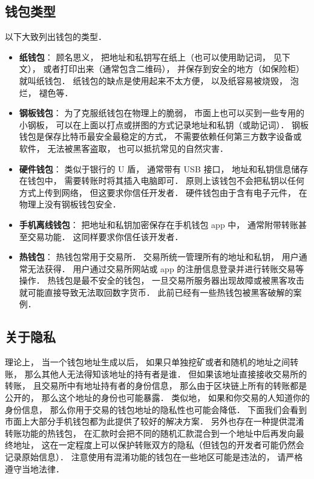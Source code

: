 \subsection{钱包类型}
以下大致列出钱包的类型．
\begin{itemize}
\item \textbf{纸钱包}： 顾名思义， 把地址和私钥写在纸上（也可以使用助记词， 见下文）， 或者打印出来（通常包含二维码）， 并保存到安全的地方（如保险柜）就叫纸钱包． 纸钱包的缺点是使用起来不太方便， 以及纸容易被烧毁， 泡烂， 褪色等．
\item \textbf{钢板钱包}： 为了克服纸钱包在物理上的脆弱， 市面上也可以买到一些专用的小钢板， 可以在上面以打点或拼图的方式记录地址和私钥（或助记词）． 钢板钱包是保存比特币最安全最稳定的方式， 不需要依赖任何第三方数字设备或软件， 无法被黑客盗取， 也可以抵抗常见的自然灾害．
\item \textbf{硬件钱包}： 类似于银行的 U 盾， 通常带有 USB 接口， 地址和私钥信息储存在钱包中， 需要转账时将其插入电脑即可． 原则上该钱包不会把私钥以任何方式上传到网络， 但这要求你信任开发者． 硬件钱包由于含有电子元件， 在物理上没有钢板钱包安全．
\item \textbf{手机离线钱包}： 把地址和私钥加密保存在手机钱包 app 中， 通常附带转账甚至交易功能． 这同样要求你信任该开发者．
\item \textbf{热钱包}： 热钱包常用于交易所． 交易所统一管理所有的地址和私钥， 用户通常无法获得． 用户通过交易所网站或 app 的注册信息登录并进行转账交易等操作． 热钱包是最不安全的钱包， 一旦交易所服务器出现故障或被黑客攻击就可能直接导致无法取回数字货币． 此前已经有一些热钱包被黑客破解的案例．
\end{itemize}

\subsection{关于隐私}
理论上， 当一个钱包地址生成以后， 如果只单独挖矿或者和随机的地址之间转账， 那么其他人无法得知该地址的持有者是谁． 但如果该地址直接接收交易所的转账， 且交易所中有地址持有者的身份信息， 那么由于区块链上所有的转账都是公开的， 那么这个地址的身份也可能暴露． 类似地， 如果和你交易的人知道你的身份信息， 那么你用于交易的钱包地址的隐私性也可能会降低． 下面我们会看到市面上大部分手机钱包都为此提供了较好的解决方案． 另外也存在一种提供混淆转账功能的热钱包， 在汇款时会把不同的随机汇款混合到一个地址中后再发向最终地址， 这在一定程度上可以保护转账双方的隐私（但钱包的开发者可能仍然会记录原始信息）． 注意使用有混淆功能的钱包在一些地区可能是违法的， 请严格遵守当地法律．

